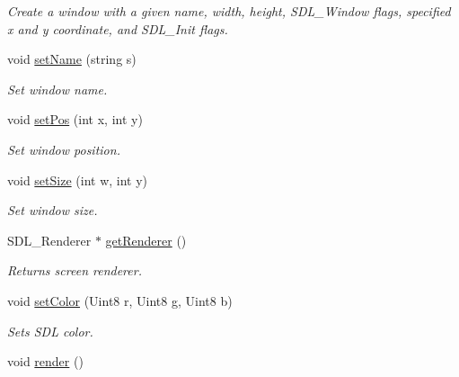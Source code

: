 \begin{DoxyCompactItemize}
\begin{DoxyCompactList}\small\item\em Create a window with a given name, width, height, S\+D\+L\+\_\+\+Window flags, specified x and y coordinate, and S\+D\+L\+\_\+\+Init flags. \end{DoxyCompactList}\item 
void \hyperlink{classEngine_ae59bcd31693811574953ba835ecb09bb}{set\+Name} (string s)\hypertarget{classEngine_ae59bcd31693811574953ba835ecb09bb}{}\label{classEngine_ae59bcd31693811574953ba835ecb09bb}

\begin{DoxyCompactList}\small\item\em Set window name. \end{DoxyCompactList}\item 
void \hyperlink{classEngine_a6133368973d175ef8915cc8033958b2b}{set\+Pos} (int x, int y)\hypertarget{classEngine_a6133368973d175ef8915cc8033958b2b}{}\label{classEngine_a6133368973d175ef8915cc8033958b2b}

\begin{DoxyCompactList}\small\item\em Set window position. \end{DoxyCompactList}\item 
void \hyperlink{classEngine_ada9e7e5de3b47113fc39fcabfe298f9e}{set\+Size} (int w, int y)\hypertarget{classEngine_ada9e7e5de3b47113fc39fcabfe298f9e}{}\label{classEngine_ada9e7e5de3b47113fc39fcabfe298f9e}

\begin{DoxyCompactList}\small\item\em Set window size. \end{DoxyCompactList}\item 
S\+D\+L\+\_\+\+Renderer $\ast$ \hyperlink{classEngine_ae42b73be55ab0fa034a0f7dea156cf9c}{get\+Renderer} ()\hypertarget{classEngine_ae42b73be55ab0fa034a0f7dea156cf9c}{}\label{classEngine_ae42b73be55ab0fa034a0f7dea156cf9c}

\begin{DoxyCompactList}\small\item\em Returns screen renderer. \end{DoxyCompactList}\item 
void \hyperlink{classEngine_aeee842a402f260e38e0502e1d95b920b}{set\+Color} (Uint8 r, Uint8 g, Uint8 b)\hypertarget{classEngine_aeee842a402f260e38e0502e1d95b920b}{}\label{classEngine_aeee842a402f260e38e0502e1d95b920b}

\begin{DoxyCompactList}\small\item\em Sets S\+DL color. \end{DoxyCompactList}\item 
void \hyperlink{classEngine_a7960743aefd62e846e7f3cd92c18bc73}{render} ()\hypertarget{classEngine_a7960743aefd62e846e7f3cd92c18bc73}{}\label{classEngine_a7960743aefd62e846e7f3cd92c18bc73}


\end{DoxyCompactItemize}
